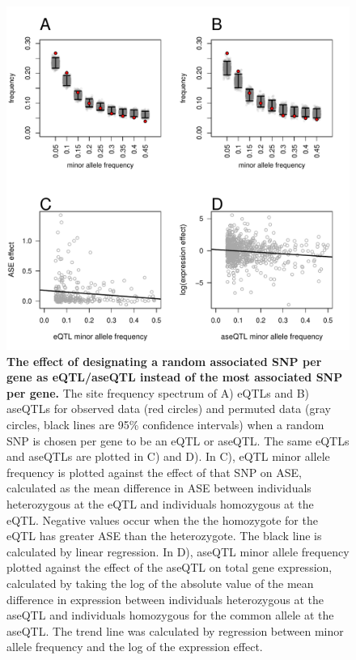 \begin{figure}[ht]
      \centering
       \includegraphics[width=\linewidth]{Ch3FigS4}
    \caption{\textbf{The effect of designating a random associated SNP per gene as eQTL/aseQTL instead of the most associated SNP per gene.} The site frequency spectrum of A) eQTLs and B) aseQTLs for observed data (red circles) and permuted data (gray circles, black lines are 95\% confidence intervals) when a random SNP is chosen per gene to be an eQTL or aseQTL. The same eQTLs and aseQTLs are plotted in C) and D). In C), eQTL minor allele frequency is plotted against the effect of that SNP on ASE, calculated as the mean difference in ASE between individuals heterozygous at the eQTL and individuals homozygous at the eQTL. Negative values occur when the the homozygote for the eQTL has greater ASE than the heterozygote. The black line is calculated by linear regression. In D), aseQTL minor allele frequency plotted against the effect of the aseQTL on total gene expression, calculated by taking the log of the absolute value of the mean difference in expression between individuals heterozygous at the aseQTL and individuals homozygous for the common allele at the aseQTL. The trend line was calculated by regression between minor allele frequency and the log of the expression effect. }
    \label{fig:3figS4}
\end{figure}

